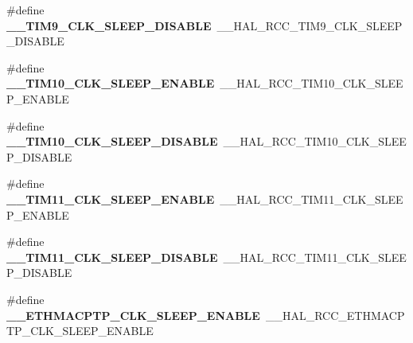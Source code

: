 \begin{DoxyCompactItemize}
\item 
\hypertarget{group___h_a_l___r_c_c___aliased_ga7f52505d183acb87448424209f9399aa}{\#define {\bfseries \-\_\-\-\_\-\-T\-I\-M9\-\_\-\-C\-L\-K\-\_\-\-S\-L\-E\-E\-P\-\_\-\-D\-I\-S\-A\-B\-L\-E}~\-\_\-\-\_\-\-H\-A\-L\-\_\-\-R\-C\-C\-\_\-\-T\-I\-M9\-\_\-\-C\-L\-K\-\_\-\-S\-L\-E\-E\-P\-\_\-\-D\-I\-S\-A\-B\-L\-E}\label{group___h_a_l___r_c_c___aliased_ga7f52505d183acb87448424209f9399aa}

\item 
\hypertarget{group___h_a_l___r_c_c___aliased_gaf1904f04654e232acf4caca31f544a33}{\#define {\bfseries \-\_\-\-\_\-\-T\-I\-M10\-\_\-\-C\-L\-K\-\_\-\-S\-L\-E\-E\-P\-\_\-\-E\-N\-A\-B\-L\-E}~\-\_\-\-\_\-\-H\-A\-L\-\_\-\-R\-C\-C\-\_\-\-T\-I\-M10\-\_\-\-C\-L\-K\-\_\-\-S\-L\-E\-E\-P\-\_\-\-E\-N\-A\-B\-L\-E}\label{group___h_a_l___r_c_c___aliased_gaf1904f04654e232acf4caca31f544a33}

\item 
\hypertarget{group___h_a_l___r_c_c___aliased_ga66de9f2e0f7f60d24c3b44f15c8523c6}{\#define {\bfseries \-\_\-\-\_\-\-T\-I\-M10\-\_\-\-C\-L\-K\-\_\-\-S\-L\-E\-E\-P\-\_\-\-D\-I\-S\-A\-B\-L\-E}~\-\_\-\-\_\-\-H\-A\-L\-\_\-\-R\-C\-C\-\_\-\-T\-I\-M10\-\_\-\-C\-L\-K\-\_\-\-S\-L\-E\-E\-P\-\_\-\-D\-I\-S\-A\-B\-L\-E}\label{group___h_a_l___r_c_c___aliased_ga66de9f2e0f7f60d24c3b44f15c8523c6}

\item 
\hypertarget{group___h_a_l___r_c_c___aliased_ga4393063c2f3b735337d6732e01ee8978}{\#define {\bfseries \-\_\-\-\_\-\-T\-I\-M11\-\_\-\-C\-L\-K\-\_\-\-S\-L\-E\-E\-P\-\_\-\-E\-N\-A\-B\-L\-E}~\-\_\-\-\_\-\-H\-A\-L\-\_\-\-R\-C\-C\-\_\-\-T\-I\-M11\-\_\-\-C\-L\-K\-\_\-\-S\-L\-E\-E\-P\-\_\-\-E\-N\-A\-B\-L\-E}\label{group___h_a_l___r_c_c___aliased_ga4393063c2f3b735337d6732e01ee8978}

\item 
\hypertarget{group___h_a_l___r_c_c___aliased_ga690afa8116fd35919a36e091a8cf5c23}{\#define {\bfseries \-\_\-\-\_\-\-T\-I\-M11\-\_\-\-C\-L\-K\-\_\-\-S\-L\-E\-E\-P\-\_\-\-D\-I\-S\-A\-B\-L\-E}~\-\_\-\-\_\-\-H\-A\-L\-\_\-\-R\-C\-C\-\_\-\-T\-I\-M11\-\_\-\-C\-L\-K\-\_\-\-S\-L\-E\-E\-P\-\_\-\-D\-I\-S\-A\-B\-L\-E}\label{group___h_a_l___r_c_c___aliased_ga690afa8116fd35919a36e091a8cf5c23}

\item 
\hypertarget{group___h_a_l___r_c_c___aliased_ga87c7d1613c6a412c2bf635b73135b6ee}{\#define {\bfseries \-\_\-\-\_\-\-E\-T\-H\-M\-A\-C\-P\-T\-P\-\_\-\-C\-L\-K\-\_\-\-S\-L\-E\-E\-P\-\_\-\-E\-N\-A\-B\-L\-E}~\-\_\-\-\_\-\-H\-A\-L\-\_\-\-R\-C\-C\-\_\-\-E\-T\-H\-M\-A\-C\-P\-T\-P\-\_\-\-C\-L\-K\-\_\-\-S\-L\-E\-E\-P\-\_\-\-E\-N\-A\-B\-L\-E}\label{group___h_a_l___r_c_c___aliased_ga87c7d1613c6a412c2bf635b73135b6ee}


\end{DoxyCompactItemize}
